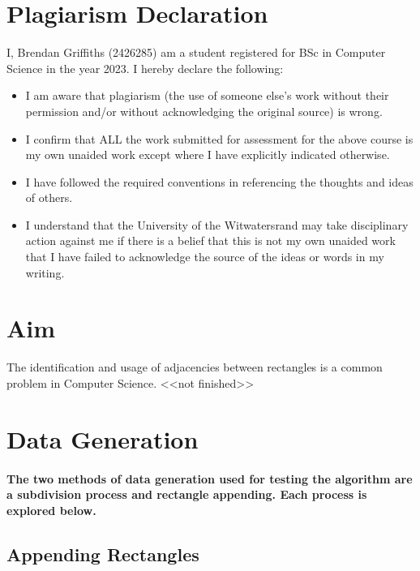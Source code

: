 \documentclass{Assignment}
\begin{document}
    \maketitle
    \tableofcontents

    \section*{Plagiarism Declaration}
        I, Brendan Griffiths (2426285) am a student registered for BSc in Computer Science in the year
        2023. I hereby declare the following:
        \begin{itemize}
            \item I am aware that plagiarism (the use of someone else's work without their permission and/or without acknowledging the original source) is wrong.
            \item I confirm that ALL the work submitted for assessment for the above course is my own unaided work except where I have explicitly indicated otherwise.
            \item I have followed the required conventions in referencing the thoughts and ideas of others.
            \item I understand that the University of the Witwatersrand may take disciplinary action against me if there is a belief that this is not my own unaided work that I have failed to acknowledge the source of the ideas or words in my writing.
        \end{itemize}

    \section{Aim}
        The identification and usage of adjacencies between rectangles is a common problem in Computer Science.
        <<not finished>>
    
    \section{Data Generation}
        \paragraph{
            The two methods of data generation used for testing the algorithm are a subdivision process and rectangle appending. Each process is explored below.
        }
        \subsection{Appending Rectangles}
\end{document}
